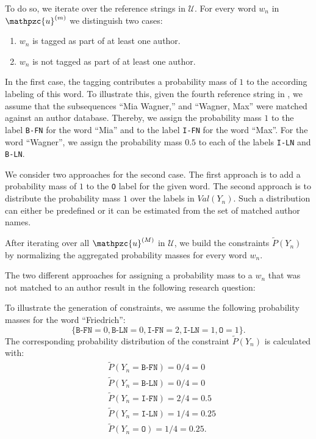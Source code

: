 To do so, we iterate over the reference strings in $\mathcal{U}$.
For every word $w_n$ in $\mathpzc{u}^{(m)}$ we distinguish two cases:
\begin{enumerate}
  \item $w_n$ is tagged as part of at least one author.
  \item $w_n$ is not tagged as part of at least one author.
\end{enumerate}

In the first case, the tagging contributes a probability mass of $1$ to the according labeling of this word.
To illustrate this, given the fourth reference string in , we assume that the subsequences ``Mia Wagner,{}'' and ``Wagner, Max'' were matched against an author database.
Thereby, we assign the probability mass $1$ to the label \texttt{B-FN} for the word ``Mia'' and to the label \texttt{I-FN} for the word ``Max''.
For the word ``Wagner'', we assign the probability mass $0.5$ to each of the labels \texttt{I-LN} and \texttt{B-LN}.

We consider two approaches for the second case.
The first approach is to add a probability mass of $1$ to the \texttt{O} label for the given word.
The second approach is to distribute the probability mass $1$ over the labels in $\mathit{Val}(Y_n)$.
Such a distribution can either be predefined or it can be estimated from the set of matched author names.

After iterating over all $\mathpzc{u}^{(M)}$ in $\mathcal{U}$, we build the constraints $\tilde{P}(Y_n)$ by normalizing the aggregated probability masses for every word $w_n$.

\bigskip

The two different approaches for assigning a probability mass to a $w_n$ that was not matched to an author result in the following research question:
\newcommand\researchquestionthree{}
\researchquestionthree%

\bigskip

To illustrate the generation of constraints, we assume the following probability masses for the word ``Friedrich'':
\begin{equation*}
  \{\texttt{B-FN}{=}0,\texttt{B-LN}{=}0,\texttt{I-FN}{=}2,\texttt{I-LN}{=}1,\texttt{O}{=}1\}.
\end{equation*}
The corresponding \gls{probability distribution} of the constraint $\tilde{P}(Y_n)$ is calculated with:
\begin{equation*}
\begin{split}
  &\tilde{P}(Y_n{=}\texttt{B-FN})=0/4=0\\
  &\tilde{P}(Y_n{=}\texttt{B-LN})=0/4=0\\
  &\tilde{P}(Y_n{=}\texttt{I-FN})=2/4=0.5\\
  &\tilde{P}(Y_n{=}\texttt{I-LN})=1/4=0.25\\
  &\tilde{P}(Y_n{=}\texttt{O})=1/4=0.25.
\end{split}
\end{equation*}


